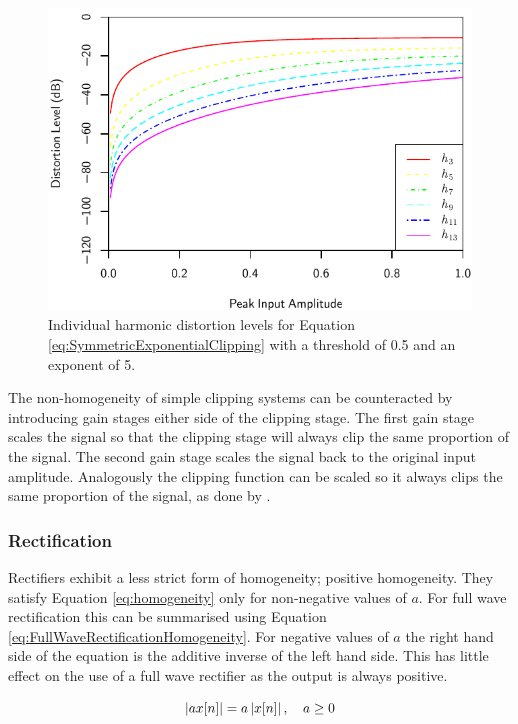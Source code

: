 			\begin{figure}[h!]
				\centering
				\includegraphics{chapter5/Images/ExponentialClippingHarmonics.pdf}
				\caption{Individual harmonic distortion levels for Equation
					 \ref{eq:SymmetricExponentialClipping} with a threshold of 0.5 and an 
				         exponent of 5.}
				\label{fig:ExponentialClippingHarmonics}
			\end{figure}

			The non-homogeneity of simple clipping systems can be counteracted by introducing gain stages
			either side of the clipping stage. The first gain stage scales the signal so that the clipping
			stage will always clip the same proportion of the signal. The second gain stage scales the signal
			back to the original input amplitude. Analogously the clipping function can be scaled so it always
			clips the same proportion of the signal, as done by \citet{deman2014adaptive}.

		\subsubsection*{Rectification}
			Rectifiers exhibit a less strict form of homogeneity; positive homogeneity. They satisfy Equation
			\ref{eq:homogeneity} only for non-negative values of $a$. For full wave rectification this can be
			summarised using Equation \ref{eq:FullWaveRectificationHomogeneity}. For negative values of $a$ the
			right hand side of the equation is the additive inverse of the left hand side. This has little
			effect on the use of a full wave rectifier as the output is always positive.

			\begin{equation}
				\left|ax[n]\right| = a\left|x[n]\right|, \quad a \geq 0
				\label{eq:FullWaveRectificationHomogeneity}
			\end{equation}

